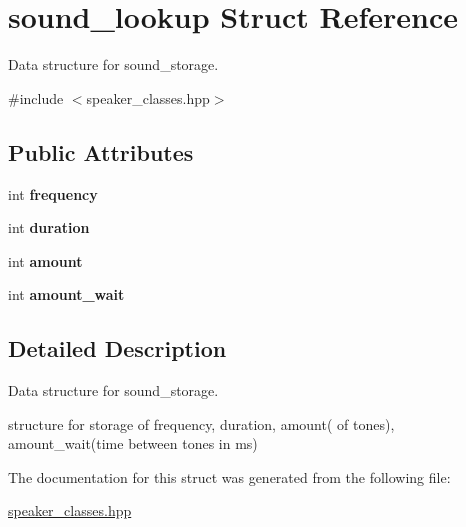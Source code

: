 \hypertarget{structsound__lookup}{}\section{sound\+\_\+lookup Struct Reference}
\label{structsound__lookup}


Data structure for sound\+\_\+storage.  




{\ttfamily \#include $<$speaker\+\_\+classes.\+hpp$>$}

\subsection*{Public Attributes}
\begin{DoxyCompactItemize}
\item 
\hypertarget{structsound__lookup_a3f597ffbf84891f44319e621db98ef81}{}\label{structsound__lookup_a3f597ffbf84891f44319e621db98ef81} 
int {\bfseries frequency}
\item 
\hypertarget{structsound__lookup_a7a155cf327d9ef451c1e9b04f940a12b}{}\label{structsound__lookup_a7a155cf327d9ef451c1e9b04f940a12b} 
int {\bfseries duration}
\item 
\hypertarget{structsound__lookup_ab6b83a017a9d6a4e28628c20f63ad473}{}\label{structsound__lookup_ab6b83a017a9d6a4e28628c20f63ad473} 
int {\bfseries amount}
\item 
\hypertarget{structsound__lookup_a8bcf50a31f32ff0081133edc380bb0a1}{}\label{structsound__lookup_a8bcf50a31f32ff0081133edc380bb0a1} 
int {\bfseries amount\+\_\+wait}
\end{DoxyCompactItemize}


\subsection{Detailed Description}
Data structure for sound\+\_\+storage. 

structure for storage of frequency, duration, amount( of tones), amount\+\_\+wait(time between tones in ms) 

The documentation for this struct was generated from the following file\+:\begin{DoxyCompactItemize}
\item 
\hyperlink{speaker__classes_8hpp}{speaker\+\_\+classes.\+hpp}\end{DoxyCompactItemize}
